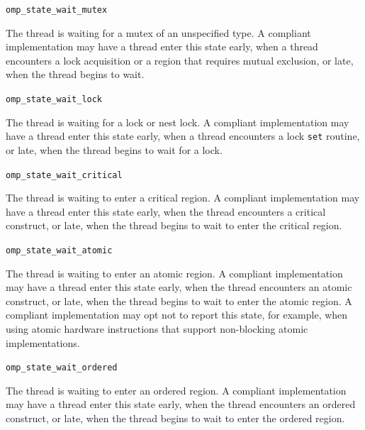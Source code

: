 \documentclass{article}
\newcommand{\descheader}[1]{{\needspace{3\baselineskip}\vspace{1em}\noindent \fbox{#1}}}
\begin{document}
\begin{description}

\item \lstinline|omp_state_wait_mutex|

  The thread is waiting for a mutex of an unspecified type. A compliant implementation
  may have a thread enter this state early, when a thread encounters a lock acquisition or a region that requires mutual exclusion, or late, when the thread begins to wait.

\item \lstinline|omp_state_wait_lock|

  The thread is waiting for a  lock  or nest lock. A compliant implementation
  may have a thread enter this state early, when a thread
  encounters a lock \lstinline|set| routine, or late, when the thread
  begins to wait for a lock.

\item \lstinline|omp_state_wait_critical| 

  The thread is waiting to enter a critical region. A compliant
  implementation may have a thread enter this state early, when the
  thread encounters a critical construct, or late, when the thread
  begins to wait to enter the critical region. 


\item \lstinline|omp_state_wait_atomic| 

  The thread is waiting to enter an atomic region. A compliant
  implementation may have a thread enter this state early, when the thread
  encounters an atomic construct, or late, when the thread begins
  to wait to enter the atomic region. 
  A compliant implementation may opt not to report
  this state, for example, when using atomic hardware instructions that support non-blocking atomic implementations.


\item \lstinline|omp_state_wait_ordered| 

  The thread is waiting to enter an ordered region. A compliant
  implementation may have a thread enter this state early, when the thread encounters
  an ordered construct, or late, when the thread begins
  to wait to enter the ordered region. 

\end{description}

\descheader{Target Wait States}
\end{document}
